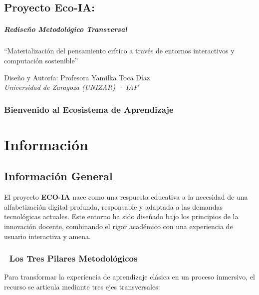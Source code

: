 \documentclass[
  spanish,
  letterpaper,
  DIV=11,
  numbers=noendperiod,
  oneside]{scrreprt}
\subtitle{Programa Formativo - Innovación Docente}
\author{}
\date{}
\renewcommand*\contentsname{Tabla de contenidos}
\newcommand\contentsname{Tabla de contenidos}
\begin{document}
\renewcommand*\contentsname{Tabla de contenidos}
{
\setcounter{tocdepth}{2}
\tableofcontents
}


\chapter{Proyecto Eco-IA:}\label{proyecto-eco-ia}

\subsubsection{Rediseño Metodológico
Transversal}\label{rediseuxf1o-metodoluxf3gico-transversal}

``Materialización del pensamiento crítico a través de entornos
interactivos y computación sostenible''

Diseño y Autoría: {Profesora Yamilka Toca Díaz}\\
\emph{Universidad de Zaragoza (UNIZAR) · IAF}

\section{Bienvenido al Ecosistema de
Aprendizaje}\label{bienvenido-al-ecosistema-de-aprendizaje}

\part{Información}

\chapter{Información General}\label{informaciuxf3n-general}

El proyecto \textbf{ECO-IA} nace como una respuesta educativa a la
necesidad de una alfabetización digital profunda, responsable y adaptada
a las demandas tecnológicas actuales. Este entorno ha sido diseñado bajo
los principios de la innovación docente, combinando el rigor académico
con una experiencia de usuario interactiva y amena.

\section{🎯 Los Tres Pilares
Metodológicos}\label{los-tres-pilares-metodoluxf3gicos}

Para transformar la experiencia de aprendizaje clásica en un proceso
inmersivo, el recurso se articula mediante tres ejes transversales:
\end{document}
